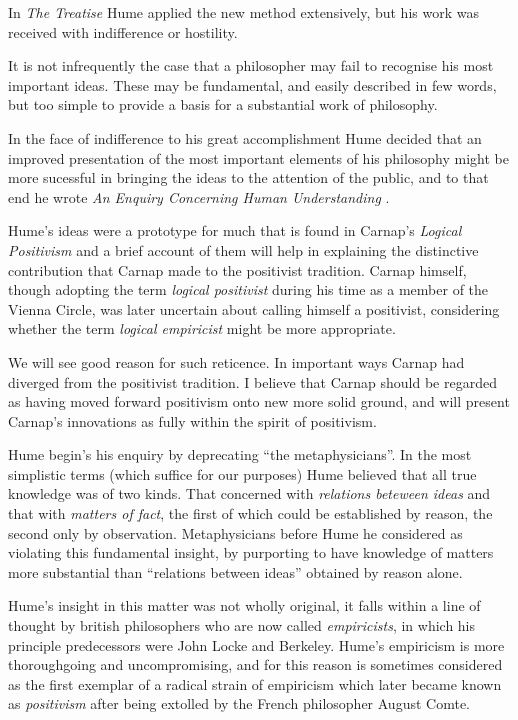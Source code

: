 In \emph{The Treatise} Hume applied the new method extensively, but his work
was received with indifference or hostility.

It is not infrequently the case that a philosopher may fail to recognise
his most important ideas.
These may be fundamental, and easily described in few words, but too simple
to provide a basis for a substantial work of philosophy.

In the face of indifference to his great accomplishment Hume decided that
an improved presentation of the most important elements of his philosophy
might be more sucessful in bringing the ideas to the attention of the
public, and to that end he wrote \emph{An Enquiry Concerning Human Understanding} \cite{hume48}.

Hume's ideas were a prototype for much that is found in Carnap's
\emph{Logical Positivism} and a brief account of them will help in explaining the distinctive
contribution that Carnap made to the positivist tradition.
Carnap himself, though adopting the term \emph{logical positivist} during his time as
a member of the Vienna Circle, was later uncertain about calling himself a positivist,
considering whether the term \emph{logical empiricist} might be more appropriate.

We will see good reason for such reticence.
In important ways Carnap had diverged from the positivist tradition.
I believe that Carnap should be regarded as having moved forward positivism onto new more solid ground, and will present Carnap's innovations as fully within the spirit of positivism.

Hume begin's his enquiry by deprecating ``the metaphysicians''.
In the most simplistic terms (which suffice for our purposes) Hume believed that all true knowledge was of two kinds.
That concerned with {\it relations beteween ideas} and that with {\it matters of fact}, the first of which could be established by reason, the second only by observation.
Metaphysicians before Hume he considered as violating this fundamental insight, by purporting to have knowledge of matters more substantial than ``relations between ideas'' obtained by reason alone.

Hume's insight in this matter was not wholly original, it falls within a line of thought by british philosophers who are now called {\it empiricists}, in which his principle predecessors were John Locke and Berkeley.
Hume's empiricism is more thoroughgoing and uncompromising, and for this reason is sometimes considered as the first exemplar of a radical strain of empiricism which later became known as {\it positivism} after being extolled by the French philosopher August Comte.



